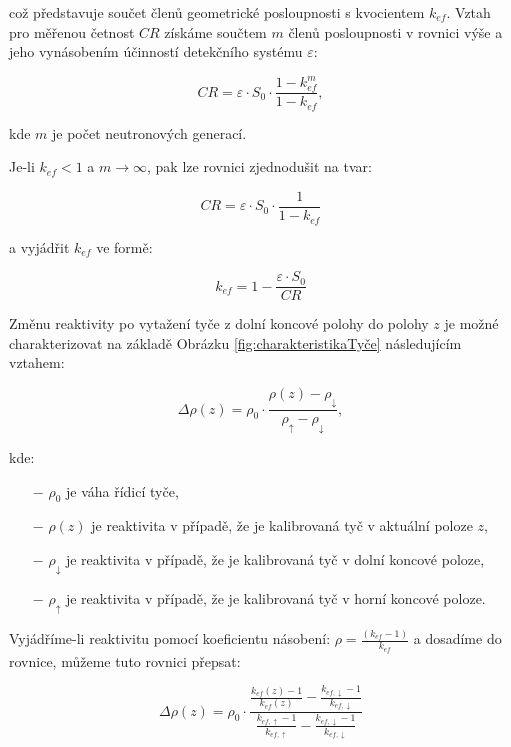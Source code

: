 což představuje součet členů geometrické posloupnosti s kvocientem $k_{ef}$. Vztah pro měřenou četnost $CR$ získáme součtem $m$ členů posloupnosti v rovnici výše a jeho vynásobením účinností detekčního systému $\varepsilon$:

\begin{equation*}
CR = \varepsilon \cdot S_0 \cdot \frac{1 - k_{ef}^m}{1 - k_{ef}},
\end{equation*}

kde $m$ je počet neutronových generací.

Je-li $ k_{ef} < 1 $ a $ m \rightarrow \infty $, pak lze rovnici zjednodušit na tvar:

\begin{equation*}
CR = \varepsilon \cdot S_0 \cdot \frac{1}{1 - k_{ef}}
\end{equation*}

a vyjádřit $ k_{ef} $ ve formě:

\begin{equation*}
k_{ef} = 1 - \frac{\varepsilon \cdot S_0}{CR}
\end{equation*}

Změnu reaktivity po vytažení tyče z dolní koncové polohy do polohy $ z $ je možné charakterizovat na základě Obrázku \ref{fig:charakteristikaTyče} následujícím vztahem:

\begin{equation*}
\Delta \rho(z) = \rho_0 \cdot \frac{ \rho(z) - \rho_\downarrow}{\rho_\uparrow - \rho_\downarrow},
\end{equation*}

kde:

\begin{itemize}%
    \item[$-$] $\rho_0$ je váha řídicí tyče,
    \item[$-$] $\rho(z)$ je reaktivita v případě, že je kalibrovaná tyč v aktuální poloze $ z $,
    \item[$-$] $\rho_\downarrow$ je reaktivita v případě, že je kalibrovaná tyč v dolní koncové poloze,%
    \item[$-$] $\rho_\uparrow$ je reaktivita v případě, že je kalibrovaná tyč v horní koncové poloze.%
\end{itemize}

Vyjádříme-li reaktivitu pomocí koeficientu násobení: $\rho = \frac{(k_{ef} - 1)}{k_{ef}}$ a dosadíme do rovnice, můžeme tuto rovnici přepsat:

\begin{equation*}
\Delta \rho(z) = \rho_0 \cdot \frac{\frac{k_{ef}(z) - 1}{k_{ef}(z)} - \frac{k_{ef,\downarrow} - 1}{k_{ef,\downarrow}}}{\frac{k_{ef,\uparrow} - 1}{k_{ef,\uparrow}} - \frac{k_{ef,\downarrow} - 1}{k_{ef,\downarrow}}}
\end{equation*}

